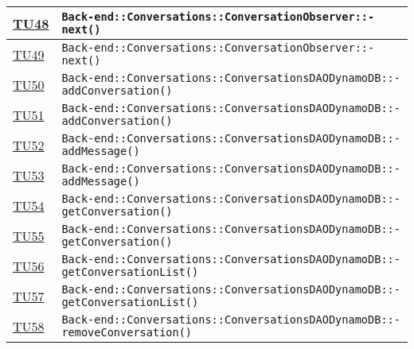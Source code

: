 \begin{longtable}{|>{\centering}m{1cm}|m{12cm}<{\centering}|}
\hyperlink{TU48}{TU48} & \texttt{Back-end::Conversations::ConversationObserver::-\linebreak next()}\\ \hline

\hyperlink{TU49}{TU49} & \texttt{Back-end::Conversations::ConversationObserver::-\linebreak next()}\\ \hline

\hyperlink{TU50}{TU50} & \texttt{Back-end::Conversations::ConversationsDAODynamoDB::-\linebreak addConversation()}\\ \hline

\hyperlink{TU51}{TU51} & \texttt{Back-end::Conversations::ConversationsDAODynamoDB::-\linebreak addConversation()}\\ \hline

\hyperlink{TU52}{TU52} & \texttt{Back-end::Conversations::ConversationsDAODynamoDB::-\linebreak addMessage()}\\ \hline

\hyperlink{TU53}{TU53} & \texttt{Back-end::Conversations::ConversationsDAODynamoDB::-\linebreak addMessage()}\\ \hline

\hyperlink{TU54}{TU54} & \texttt{Back-end::Conversations::ConversationsDAODynamoDB::-\linebreak getConversation()}\\ \hline

\hyperlink{TU55}{TU55} & \texttt{Back-end::Conversations::ConversationsDAODynamoDB::-\linebreak getConversation()}\\ \hline

\hyperlink{TU56}{TU56} & \texttt{Back-end::Conversations::ConversationsDAODynamoDB::-\linebreak getConversationList()}\\ \hline

\hyperlink{TU57}{TU57} & \texttt{Back-end::Conversations::ConversationsDAODynamoDB::-\linebreak getConversationList()}\\ \hline

\hyperlink{TU58}{TU58} & \texttt{Back-end::Conversations::ConversationsDAODynamoDB::-\linebreak removeConversation()}\\ \hline


\end{longtable}
